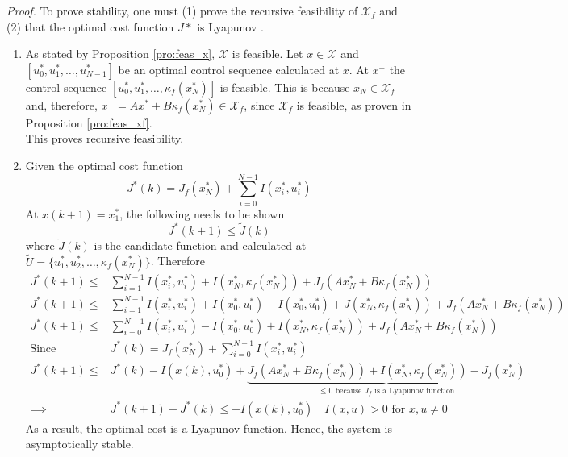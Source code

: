 \textit{Proof.} To prove stability, one must (1) prove the recursive feasibility of $\mathcal{X}_f$ and (2) that the optimal cost function $J*$ is Lyapunov .
\begin{enumerate}
	\item As stated by Proposition \ref{pro:feas_x}, $\mathcal{X}$ is feasible. Let $x\in \mathcal{X}$ and $[u^*_0, u^*_1, \dots, u^*_{N-1}]$ be an optimal control sequence calculated at $x$. At $x^+$ the control sequence $[u^*_0, u^*_1, \dots, \kappa_f(x^*_N)]$ is feasible. This is because $x_N\in \mathcal{X}_f$ and, therefore, $x_+=Ax^*+B\kappa_f(x^*_N) \in \mathcal{X}_f$, since $\mathcal{X}_f$ is feasible, as proven in Proposition \ref{pro:feas_xf}.\\
	This proves recursive feasibility.
	\item Given the optimal cost function
	\begin{equation*}
	J^*(k) = J_f(x^*_N)+\sum_{i=0}^{N-1}I(x^*_i, u^*_i)
	\end{equation*}
	At $x(k+1) = x^*_1$, the following needs to be shown
	\begin{equation*}
		J^*(k+1) \leq \widetilde{J}(k)
	\end{equation*}
	where $\widetilde{J}(k)$ is the candidate function and calculated at $\widetilde{U} = \{u^*_1, u^*_2, \dots, \kappa_f(x^*_N)\}$. Therefore
	\begin{align*}
		J^*(k+1) \leq& \sum_{i=1}^{N-1}I(x^*_i, u^*_i) + I(x^*_N, \kappa_f(x^*_N)) + J_f(Ax^*_N + B \kappa_f(x^*_N))\\
		J^*(k+1) \leq& \sum_{i=1}^{N-1}I(x^*_i, u^*_i) +I(x^*_0, u^*_0)-I(x^*_0, u^*_0) + J(x^*_N, \kappa_f(x^*_N)) + J_f(Ax^*_N + B \kappa_f(x^*_N))\\
		J^*(k+1) \leq& \sum_{i=0}^{N-1}I(x^*_i, u^*_i) -I(x^*_0, u^*_0) + I(x^*_N, \kappa_f(x^*_N)) + J_f(Ax^*_N + B \kappa_f(x^*_N))\\
		\text{Since }&J^*(k) = J_f(x^*_N)+\sum_{i=0}^{N-1}I(x^*_i, u^*_i)\\
		J^*(k+1) \leq& J^*(k)  -I(x(k), u^*_0)+  \underset{\leq 0 \text{ because $J_f$ is a Lyapunov function}}{\underbrace{J_f(Ax^*_N + B \kappa_f(x^*_N)) + I(x^*_N, \kappa_f(x^*_N)) - J_f(x^*_N)}}\\
		\implies& J^*(k+1) - J^*(k) \leq -I(x(k), u^*_0) \quad I(x,u) >0 \text{ for }x,u \neq 0
	\end{align*}
	As a result, the optimal cost is a Lyapunov function. Hence, the system is asymptotically stable. 
\end{enumerate}

